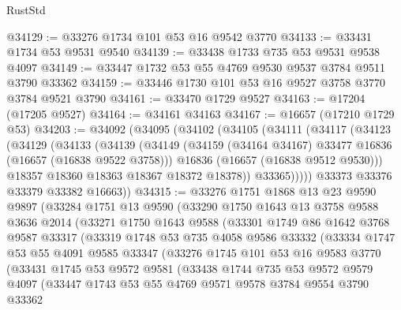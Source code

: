 \begin{lexlean}{RustStd}
\begin{coremodule}
@34129 := @33276 @1734 @101 @53 @16 @9542 @3770
@34133 := @33431 @1734 @53 @9531 @9540
@34139 := @33438 @1733 @735 @53 @9531 @9538 @4097
@34149 := @33447 @1732 @53 @55 @4769 @9530 @9537 @3784 @9511 @3790 @33362
@34159 := @33446 @1730 @101 @53 @16 @9527 @3758 @3770 @3784 @9521 @3790
@34161 := @33470 @1729 @9527
@34163 := @17204 (@17205 @9527)
@34164 := @34161 @34163
@34167 := @16657 (@17210 @1729 @53)
@34203 := @34092
    (@34095
      (@34102
        (@34105
          (@34111
            (@34117
              (@34123
                (@34129
                  (@34133
                    (@34139
                      (@34149
                        (@34159 (@34164 @34167) @33477 @16836 (@16657 (@16838 @9522 @3758)))
                        @16836
                        (@16657 (@16838 @9512 @9530)))
                      @18357
                      @18360
                      @18363
                      @18367
                      @18372
                      @18378))
                  @33365)))))
        @33373
        @33376
        @33379
        @33382
        @16663))
@34315 := @33276
    @1751
    @1868
    @13
    @23
    @9590
    @9897
    (@33284
      @1751
      @13
      @9590
      (@33290
        @1750
        @1643
        @13
        @3758
        @9588
        @3636
        @2014
        (@33271
          @1750
          @1643
          @9588
          (@33301
            @1749
            @86
            @1642
            @3768
            @9587
            @33317
            (@33319
              @1748
              @53
              @735
              @4058
              @9586
              @33332
              (@33334
                @1747
                @53
                @55
                @4091
                @9585
                @33347
                (@33276
                  @1745
                  @101
                  @53
                  @16
                  @9583
                  @3770
                  (@33431
                    @1745
                    @53
                    @9572
                    @9581
                    (@33438
                      @1744
                      @735
                      @53
                      @9572
                      @9579
                      @4097
                      (@33447
                        @1743
                        @53
                        @55
                        @4769
                        @9571
                        @9578
                        @3784
                        @9554
                        @3790
                        @33362

\end{coremodule}
\end{lexlean}
